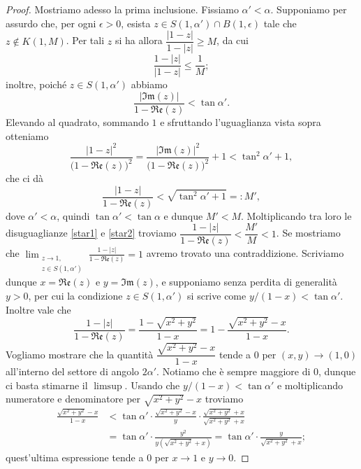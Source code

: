 \begin{proof}
  Mostriamo adesso la prima inclusione. Fissiamo $\alpha'<\alpha$. Supponiamo per assurdo che, per ogni $\epsilon>0$, esista $z \in S(1,\alpha')\cap B(1,\epsilon)$ tale che $z \not\in K(1,M)$. Per tali $z$ si ha allora $\dfrac{|1-z|}{1-|z|} \ge M$, da cui
  \begin{equation}
    \dfrac{1-|z|}{|1-z|} \le \dfrac{1}{M}; \label{star1}
  \end{equation}
  inoltre, poiché $z \in S(1,\alpha')$ abbiamo
  $$\frac{|\mathfrak{Im}(z)|}{1-\mathfrak{Re}(z)}<\tan{\alpha'}.$$
  Elevando al quadrato, sommando $1$ e sfruttando l'uguaglianza vista sopra otteniamo
  $$\frac{|1-z|^2}{\bigl(1-\mathfrak{Re}(z)\bigr)^2}=\frac{|\mathfrak{Im}(z)|^2}{\bigl(1-\mathfrak{Re}(z)\bigr)^2}+1<\tan^2{\alpha'}+1,$$
  che ci dà
  \begin{equation}
    \frac{|1-z|}{1-\mathfrak{Re}(z)}<\sqrt{\tan^2{\alpha'}+1}=:M', \label{star2}
  \end{equation}
  dove $\alpha'<\alpha$, quindi $\tan{\alpha'}<\tan{\alpha}$ e dunque $M'<M$. Moltiplicando tra loro le disuguaglianze \eqref{star1} e \eqref{star2} troviamo $\dfrac{1-|z|}{1-\mathfrak{Re}(z)}<\dfrac{M'}{M}<1$.
  Se mostriamo che $\displaystyle \lim_{\substack{z \longrightarrow 1, \\ z \in S(1,\alpha')}} \frac{1-|z|}{1-\mathfrak{Re}(z)}=1$ avremo trovato una contraddizione. Scriviamo dunque $x=\mathfrak{Re}(z)$ e $y=\mathfrak{Im}(z)$, e supponiamo senza perdita di generalità $y>0$, per cui la condizione $z \in S(1,\alpha')$ si scrive come $y/(1-x)<\tan{\alpha'}$. Inoltre vale che
  $$\frac{1-|z|}{1-\mathfrak{Re}(z)}=\frac{1-\sqrt{x^2+y^2}}{1-x}=1-\frac{\sqrt{x^2+y^2}-x}{1-x}.$$
  Vogliamo mostrare che la quantità $\dfrac{\sqrt{x^2+y^2}-x}{1-x}$ tende a $0$ per $(x,y) \longrightarrow (1,0)$ all'interno del settore di angolo $2\alpha'$. Notiamo che è sempre maggiore di $0$, dunque ci basta stimarne il $\limsup$. Usando che $y/(1-x)<\tan{\alpha'}$ e moltiplicando numeratore e denominatore per $\sqrt{x^2+y^2}-x$ troviamo
  \begin{align*}
    \frac{\sqrt{x^2+y^2}-x}{1-x} & < \tan{\alpha'}\cdot\frac{\sqrt{x^2+y^2}-x}{y}\cdot\frac{\sqrt{x^2+y^2}+x}{\sqrt{x^2+y^2}+x} \\
    & =\tan{\alpha'}\cdot\frac{y^2}{y(\sqrt{x^2+y^2}+x)}=\tan{\alpha'}\cdot\frac{y}{\sqrt{x^2+y^2}+x};
  \end{align*}
  quest'ultima espressione tende a $0$ per $x \longrightarrow 1$ e $y \longrightarrow 0$.
\end{proof}

